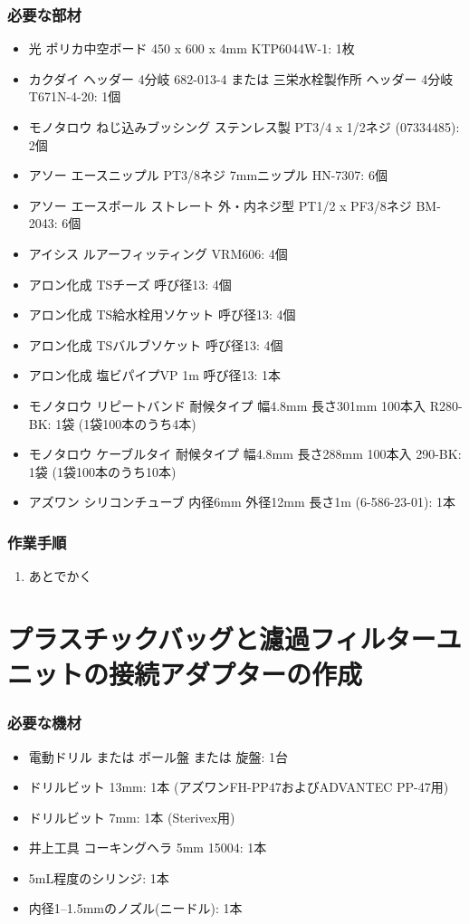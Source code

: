 \documentclass[titlepage,10pt,a4paper,uplatex]{jsbook}
\begin{document}
\subsubsection{必要な部材}
\begin{itemize}
\item 光 ポリカ中空ボード 450 x 600 x 4mm KTP6044W-1: 1枚
\item カクダイ ヘッダー 4分岐 682-013-4 または 三栄水栓製作所 ヘッダー 4分岐 T671N-4-20: 1個
\item モノタロウ ねじ込みブッシング ステンレス製 PT3/4 x 1/2ネジ (07334485): 2個
\item アソー エースニップル PT3/8ネジ 7mmニップル HN-7307: 6個
\item アソー エースボール ストレート 外・内ネジ型 PT1/2 x PF3/8ネジ BM-2043: 6個
\item アイシス ルアーフィッティング VRM606: 4個
\item アロン化成 TSチーズ 呼び径13: 4個
\item アロン化成 TS給水栓用ソケット 呼び径13: 4個
\item アロン化成 TSバルブソケット 呼び径13: 4個
\item アロン化成 塩ビパイプVP 1m 呼び径13: 1本
\item モノタロウ リピートバンド 耐候タイプ 幅4.8mm 長さ301mm 100本入 R280-BK: 1袋 (1袋100本のうち4本)
\item モノタロウ ケーブルタイ 耐候タイプ 幅4.8mm 長さ288mm 100本入 290-BK: 1袋 (1袋100本のうち10本)
\item アズワン シリコンチューブ 内径6mm 外径12mm 長さ1m (6-586-23-01): 1本
\end{itemize}

\subsubsection{作業手順}
\begin{enumerate}
\item あとでかく
\end{enumerate}

\section{プラスチックバッグと濾過フィルターユニットの接続アダプターの作成}\label{makingfilteradapter}

\subsubsection{必要な機材}
\begin{itemize}
\item 電動ドリル または ボール盤 または 旋盤: 1台
\item ドリルビット 13mm: 1本 (アズワンFH-PP47およびADVANTEC PP-47用)
\item ドリルビット 7mm: 1本 (Sterivex用)
\item 井上工具 コーキングヘラ 5mm 15004: 1本
\item 5mL程度のシリンジ: 1本
\item 内径1--1.5mmのノズル(ニードル): 1本
\end{itemize}
\end{document}
